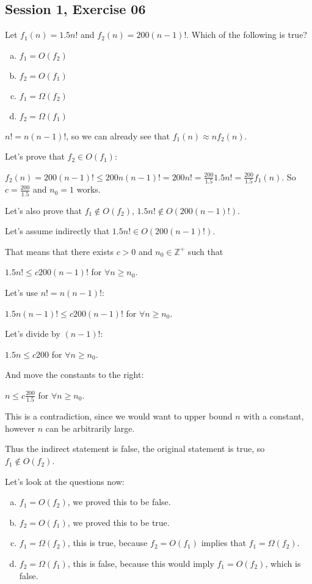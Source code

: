 \subsection{Session 1, Exercise 06}


Let $f_1(n) = 1.5n!$ and $f_2(n)=200(n-1)!$. Which of the following is true?

\begin{enumerate}[a.)]
    \item $f_1=O(f_2)$
    \item $f_2=O(f_1)$
    \item $f_1=\Omega(f_2)$
    \item $f_2=\Omega(f_1)$
\end{enumerate}


$n! = n(n-1)!$, so we can already see that $f_1(n) \approx nf_2(n)$.

Let's prove that $f_2 \in{} O(f_1)$:

$f_2(n) = 200(n-1)! \leq{} 200n(n-1)! = 200n! = \frac{200}{1.5}1.5n! = \frac{200}{1.5}f_1(n)$. So $c=\frac{200}{1.5}$ and $n_0=1$ works.

Let's also prove that $f_1 \notin{} O(f_2)$, $1.5n! \notin{} O(200(n-1)!)$.

Let's assume indirectly that $1.5n! \in{} O(200(n-1)!)$.

That means that there exists $c>0$ and $n_0\in{}\mathds{Z}^+$ such that

$1.5n! \leq{} c200(n-1)!$ for $\forall{}n\geq{}n_0$.

Let's use $n!=n(n-1)!$:

$1.5n(n-1)! \leq{} c200(n-1)!$ for $\forall{}n\geq{}n_0$.

Let's divide by $(n-1)!$:

$1.5n \leq{} c200$ for $\forall{}n\geq{}n_0$.

And move the constants to the right:

$n \leq{} c\frac{200}{1.5}$ for $\forall{}n\geq{}n_0$.

This is a contradiction, since we would want to upper bound $n$ with a constant, however $n$ can be arbitrarily large.

Thus the indirect statement is false, the original statement is true, so $f_1 \notin{} O(f_2)$.

Let's look at the questions now:

\begin{enumerate}[a.)]
    \item $f_1=O(f_2)$, we proved this to be false.
    \item $f_2=O(f_1)$, we proved this to be true.
    \item $f_1=\Omega(f_2)$, this is true, because $f_2=O(f_1)$ implies that $f_1=\Omega(f_2)$.
    \item $f_2=\Omega(f_1)$, this is false, because this would imply $f_1=O(f_2)$, which is false.
\end{enumerate}


